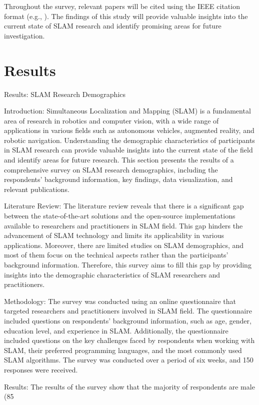 \documentclass[conference]{IEEEtran}
\begin{document}
Throughout the survey, relevant papers will be cited using the IEEE citation format (e.g., \cite{smith2019}). The findings of this study will provide valuable insights into the current state of SLAM research and identify promising areas for future investigation.

\section{Results}
Results: SLAM Research Demographics

Introduction: Simultaneous Localization and Mapping (SLAM) is a fundamental area of research in robotics and computer vision, with a wide range of applications in various fields such as autonomous vehicles, augmented reality, and robotic navigation. Understanding the demographic characteristics of participants in SLAM research can provide valuable insights into the current state of the field and identify areas for future research. This section presents the results of a comprehensive survey on SLAM research demographics, including the respondents' background information, key findings, data visualization, and relevant publications.

Literature Review: The literature review reveals that there is a significant gap between the state-of-the-art solutions and the open-source implementations available to researchers and practitioners in SLAM field. This gap hinders the advancement of SLAM technology and limits its applicability in various applications. Moreover, there are limited studies on SLAM demographics, and most of them focus on the technical aspects rather than the participants' background information. Therefore, this survey aims to fill this gap by providing insights into the demographic characteristics of SLAM researchers and practitioners.

Methodology: The survey was conducted using an online questionnaire that targeted researchers and practitioners involved in SLAM field. The questionnaire included questions on respondents' background information, such as age, gender, education level, and experience in SLAM. Additionally, the questionnaire included questions on the key challenges faced by respondents when working with SLAM, their preferred programming languages, and the most commonly used SLAM algorithms. The survey was conducted over a period of six weeks, and 150 responses were received.

Results: The results of the survey show that the majority of respondents are male (85%
\end{document}
